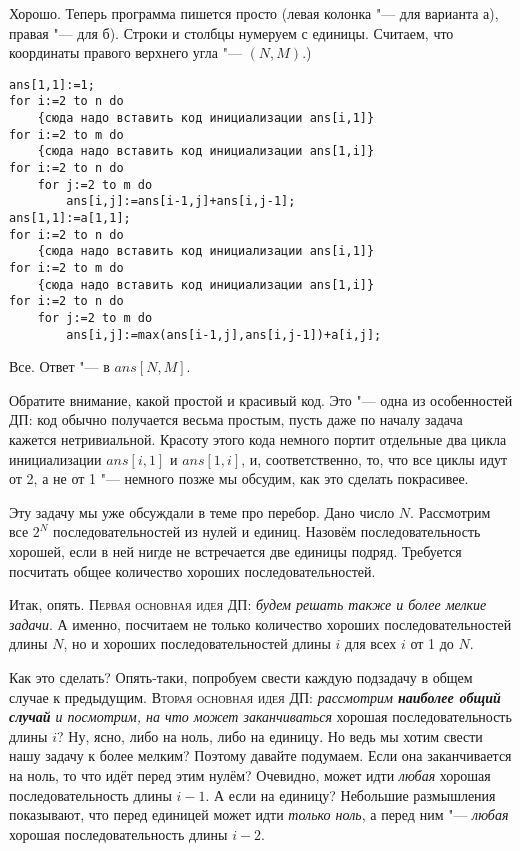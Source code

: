 Хорошо. Теперь программа пишется просто (левая колонка "--- для варианта а), правая "--- для б). 
Строки и столбцы нумеруем с единицы. Считаем, что координаты правого верхнего угла "--- $(N,M)$.)
\begin{codesample}\begin{verbatim}
ans[1,1]:=1;
for i:=2 to n do
    {сюда надо вставить код инициализации ans[i,1]}
for i:=2 to m do
    {сюда надо вставить код инициализации ans[1,i]}
for i:=2 to n do
    for j:=2 to m do
        ans[i,j]:=ans[i-1,j]+ans[i,j-1];
ans[1,1]:=a[1,1];
for i:=2 to n do
    {сюда надо вставить код инициализации ans[i,1]}
for i:=2 to m do
    {сюда надо вставить код инициализации ans[1,i]}
for i:=2 to n do
    for j:=2 to m do
        ans[i,j]:=max(ans[i-1,j],ans[i,j-1])+a[i,j];
\end{verbatim}
\end{codesample}

Все. Ответ "--- в $ans[N,M]$.

Обратите внимание, какой простой и красивый код. Это "--- одна из особенностей ДП: код обычно 
получается весьма простым, пусть даже по началу задача кажется нетривиальной. Красоту этого кода 
немного портит отдельные два цикла инициализации $ans[i,1]$ и $ans[1,i]$, и, соответственно, то, 
что все циклы идут от 2, а не от 1 "--- немного позже мы обсудим, как это сделать покрасивее.

 Эту задачу мы уже обсуждали 
в теме про перебор. Дано число $N$. Рассмотрим все $2^N$ последовательностей из нулей и единиц. 
Назовём последовательность хорошей, если в ней нигде не встречается две единицы подряд. Требуется 
посчитать общее количество хороших последовательностей.

Итак, опять. \textsc{Первая основная идея ДП:} \textit{будем решать также и более мелкие задачи}. А 
именно, посчитаем не только количество хороших последовательностей длины $N$, но и хороших 
последовательностей длины $i$ для всех $i$ от 1 до $N$.

Как это сделать? Опять-таки, попробуем свести каждую подзадачу в общем случае к предыдущим. 
\textsc{Вторая основная идея ДП:} \textit{рассмотрим \textbf{наиболее общий случай} и 
посмотрим, на что может заканчиваться} хорошая последовательность длины $i$? Ну, ясно, 
либо на ноль, либо на единицу. Но ведь мы хотим свести нашу задачу к более мелким? Поэтому давайте 
подумаем. Если она заканчивается на ноль, то что идёт перед этим нулём? Очевидно, может идти 
\textit{любая} хорошая последовательность длины $i-1$. А если на единицу? Небольшие размышления 
показывают, что перед единицей может идти \textit{только ноль}, а перед ним "--- \textit{любая}
хорошая последовательность длины $i-2$.

